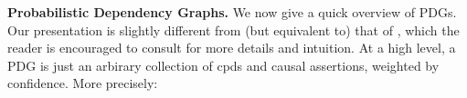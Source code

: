 \documentclass[twoside]{article}
\begin{document}
\textbf{Probabilistic Dependency Graphs.}
We now give a quick overview of PDGs. Our presentation is slightly
different from (but equivalent to) that of 
\textcite{pdg-aaai}, which 
the reader is encouraged to consult for more details and intuition.
At a high level, a PDG
is just an arbirary collection of cpds and causal assertions,
    weighted by confidence. More precisely:
\end{document}
